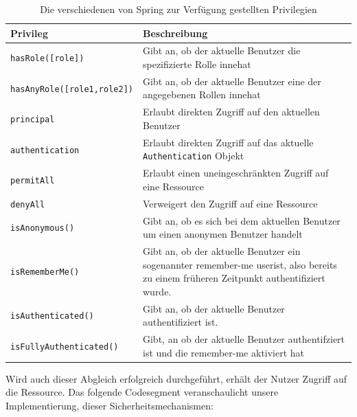 \begin{table}[hbt]
 \caption[Die verschiedenen von Spring zur Verfügung gestellten Privilegien, Quelle: Walls (2011), S. 262]{Die verschiedenen von Spring zur Verfügung gestellten Privilegien \cite{walls:2011}}
  \begin{tabular}{lp{9.5cm}}
    \toprule 
    \textbf{Privileg} & \textbf{Beschreibung} \\
    \hline
    \texttt{hasRole([role])} & Gibt an, ob der aktuelle Benutzer die spezifizierte Rolle innehat \\
    \texttt{hasAnyRole([role1,role2])} & Gibt an, ob der aktuelle Benutzer eine der angegebenen Rollen innehat \\
	\texttt{principal} & Erlaubt direkten Zugriff auf den aktuellen Benutzer \\
	\texttt{authentication} & Erlaubt direkten Zugriff auf das aktuelle \texttt{Authentication} Objekt \\
	\texttt{permitAll} & Erlaubt einen uneingeschränkten Zugriff auf eine Ressource \\
	\texttt{denyAll} & Verweigert den Zugriff auf eine Ressource \\
	\texttt{isAnonymous()} & Gibt an, ob es sich bei dem aktuellen Benutzer um einen anonymen Benutzer handelt \\
	\texttt{isRememberMe()} & Gibt an, ob der aktuelle Benutzer ein sogenannter \grqq{} remember-me user\glqq ist, also bereits zu einem früheren Zeitpunkt authentifiziert wurde. \\
	\texttt{isAuthenticated()} & Gibt an, ob der aktuelle Benutzer authentifiziert ist. \\
	\texttt{isFullyAuthenticated()} & Gibt, an ob der aktuelle Benutzer authentifziert ist und die \grqq{} remember-me\grqq{} aktiviert hat \\
	\bottomrule
  \end{tabular}
\end{table} 
\bigskip
Wird auch dieser Abgleich erfolgreich durchgeführt, erhält der Nutzer Zugriff auf die Ressource. Das 
folgende Codesegment veranschaulicht unsere Implementierung, dieser Sicherheitsmechanismen: \\

